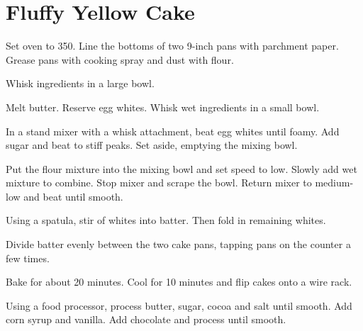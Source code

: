 \section{Fluffy Yellow Cake}
\begin{recipe}


Set oven to 350\degree{}. 
Line the bottoms of two 9-inch pans with parchment paper. 
Grease pans with cooking spray and dust with flour. 


Whisk ingredients in a large bowl. 


Melt butter. Reserve egg whites. Whisk wet ingredients in a small bowl. 


In a stand mixer with a whisk attachment, beat egg whites until foamy. 
Add sugar and beat to stiff peaks. Set aside, emptying the mixing bowl.

Put the flour mixture into the mixing bowl and set speed to low.
Slowly add wet mixture to combine. Stop mixer and scrape the bowl.
Return mixer to medium-low and beat until smooth. 

Using a spatula, stir  of whites into batter. Then fold in remaining whites.

Divide batter evenly between the two cake pans, tapping pans on the counter a few times. 

Bake for about 20 minutes. Cool for 10 minutes and flip cakes onto a wire rack.


Using a food processor, process butter, sugar, cocoa and salt until smooth. 
Add corn syrup and vanilla. 
Add chocolate and process until smooth.

\end{recipe}
